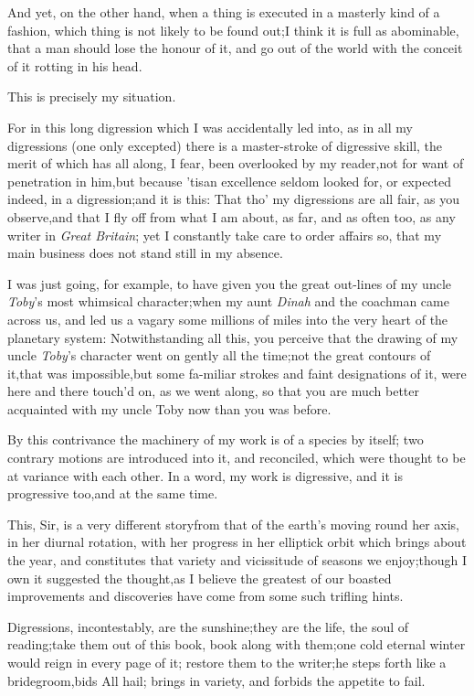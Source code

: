 \documentclass{article}
\begin{document}
And yet, on the other hand, when a thing is executed in a
masterly kind of a fashion, which thing is not likely to be found
out;\tsk  I think it is full as abominable, that a man should lose
the honour of it, and go out of the world with the conceit of it
rotting in his head.

This is precisely my situation.

For in this long digression which I was accidentally led into,
as in all my digressions (one only excepted) there is a
master-stroke of digressive skill, the merit of which has all
along, I fear, been overlooked by my reader,\tsk  not for want of
penetration in him,\tsk  but because ’tis\pb an excellence
seldom looked for, or expected indeed, in a digression;\tsk  and
it is this: That tho’ my digressions are all fair, as you
observe,\tsk  and that I fly off from what I am about, as far, and
as often too, as any writer in \textit{Great Britain}; yet I
constantly take care to order affairs so, that my main business does
not stand still in my absence.

I was just going, for example, to have given you the great
out-lines of my uncle \textit{Toby}’s most whimsical
character;\tsk  when my aunt \textit{Dinah} and the coachman came
across us, and led us a vagary some millions of miles into the very
heart of the planetary system: Notwithstanding all this, you
perceive that the drawing of my uncle \textit{Toby}’s character
went on gently all the time;\tsk  not the great contours of
it,\tsk  that was impossible,\tsk  but some fa-\pb miliar strokes and
faint designations of it, were here and there touch’d on, as
we went along, so that you are much better acquainted with my uncle
Toby now than you was before.

By this contrivance the machinery of my work is of a species by
itself; two contrary motions are introduced into it, and
reconciled, which were thought to be at variance with each other.
In a word, my work is digressive, and it is progressive
too,\tsk  and at the same time.

This, Sir, is a very different story\break from that of the
earth’s moving round her axis, in her diurnal rotation,
with her progress in her elliptick orbit which brings
about the year, and constitutes that variety and vicissitude of
seasons we enjoy;\tsk  though I own it suggested the\pb
thought,\tsk  as I believe the greatest of our boasted
improvements and discoveries have come from some such trifling\break
hints.

Digressions, incontestably, are the sun\-shine;\tsh  they
are the life, the soul of reading;\tsk  take them out of this
book, 
 book along
with them;\tsk  one cold eternal winter would reign in every page
of it; restore them to the writer;\tsk  he steps forth like a
bridegroom,\tsk  bids All hail; brings in variety, and forbids the
appetite to fail.
\end{document}
